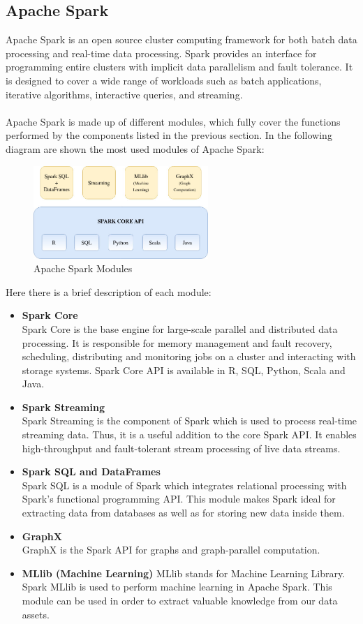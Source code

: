 \documentclass[10pt]{report}
\begin{document}
\subsection{Apache Spark}
Apache Spark is an open source cluster computing framework for both batch data processing and real-time data processing. Spark provides an interface for programming entire clusters with implicit data parallelism and fault tolerance. It is designed to cover a wide range of workloads such as batch applications, iterative algorithms, interactive queries, and streaming.\\ \\
Apache Spark is made up of different modules, which fully cover the functions performed by the components listed in the previous section. In the following diagram are shown the most used modules of Apache Spark:
\begin{figure}[H]
    \centering
    \includegraphics[width=250px]{Architecture/ApacheSpark.jpg}
    \caption{Apache Spark Modules}
\end{figure}
Here there is a brief description of each module:
\begin{itemize}
    \item \textbf{Spark Core}\\
    Spark Core is the base engine for large-scale parallel and distributed data processing. It is responsible for memory management and fault recovery, scheduling, distributing and monitoring jobs on a cluster and interacting with storage systems. Spark Core API is available in R, SQL, Python, Scala and Java.
    \item \textbf{Spark Streaming}\\
    Spark Streaming is the component of Spark which is used to process real-time streaming data. Thus, it is a useful addition to the core Spark API. It enables high-throughput and fault-tolerant stream processing of live data streams.
    \item \textbf{Spark SQL and DataFrames}\\
    Spark SQL is a module of Spark which integrates relational processing with Spark’s functional programming API. This module makes Spark ideal for extracting data from databases as well as for storing new data inside them.
    \item \textbf{GraphX}\\
    GraphX is the Spark API for graphs and graph-parallel computation.
    \item \textbf{MLlib (Machine Learning)}
    MLlib stands for Machine Learning Library. Spark MLlib is used to perform machine learning in Apache Spark. This module can be used in order to extract valuable knowledge from our data assets.
\end{itemize}
\end{document}
